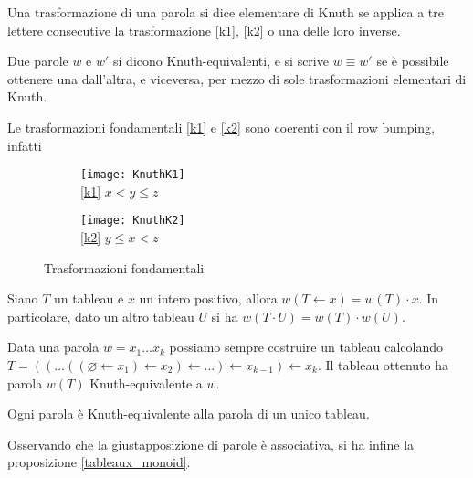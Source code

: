 \begin{defn}
Una trasformazione di una parola si dice elementare di Knuth se
applica a tre lettere consecutive la trasformazione \eqref{k1},
\eqref{k2} o una delle loro inverse.
\end{defn}

\begin{defn}
Due parole $w$ e $w'$ si dicono Knuth-equivalenti, e si scrive $w
\equiv w'$ se \`e possibile ottenere una dall'altra, e viceversa, per
mezzo di sole trasformazioni elementari di Knuth.
\end{defn}
\begin{oss}
Le trasformazioni fondamentali \eqref{k1} e \eqref{k2} sono coerenti
con il row bumping, infatti

\begin{figure}[h]
\centering

\begin{subfigure}[b]{0.3\textwidth}
\centering
\texttt{[image: KnuthK1]}\\
\eqref{k1} $x < y \leq z$
\end{subfigure}%
\begin{subfigure}[b]{0.3\textwidth}
\centering
\texttt{[image: KnuthK2]}\\
\eqref{k2} $y \leq x < z$
\end{subfigure}

\caption{Trasformazioni fondamentali}
\end{figure}
\end{oss}

\begin{prop}\label{word_bump_equiv}
Siano $T$ un tableau e $x$ un intero positivo, allora $w(T \gets x) = w(T)
\cdot x$. In particolare, dato un altro tableau $U$ si ha $w(T\cdot U)
= w(T) \cdot w(U)$.
\end{prop}

Data una parola $w = x_1 \ldots x_k$ possiamo sempre costruire un
tableau calcolando $T = (( \ldots ((\varnothing \gets x_1) \gets x_2 ) \gets \ldots ) \gets x_{k-1} )
\gets x_k$. Il tableau ottenuto ha parola $w(T)$ Knuth-equivalente a
$w$.

\begin{teo}
Ogni parola \`e Knuth-equivalente alla parola di un unico tableau.
\end{teo}

Osservando che la giustapposizione di parole \`e associativa, si ha
infine la proposizione \eqref{tableaux_monoid}.
